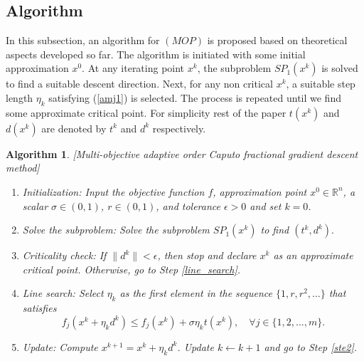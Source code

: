 \documentclass[smallextended,referee,envcountsect]{svjour3}
\newtheorem{Algorithm}{Algorithm}[section]
\begin{document}
\subsection{Algorithm}
In this subsection, an algorithm for $(MOP)$ is proposed based on theoretical aspects developed so far. The algorithm is initiated with some initial approximation $x^0$. At any iterating point $x^k$, the subproblem $SP_1(x^k)$ is solved to find a suitable descent direction. Next, for any non critical $x^k$, a suitable step length $\eta_k$ satisfying (\ref{amj1}) is selected. The process is repeated until we find some approximate critical point. For simplicity rest of the paper $t(x^k)$ and $d(x^k)$ are denoted by $t^k$ and $d^k$ respectively.
\begin{Algorithm}\label{algorithm 1} [Multi-objective adaptive order Caputo fractional gradient descent method]
\begin{enumerate}
    \item {\it Initialization:} Input the objective function $f$, approximation point $x^0 \in \mathbb{R}^n$, a scalar $\sigma \in (0, 1)$, $r \in (0,1)$, and tolerance $\epsilon > 0$ and set  $k = 0$.
    \item {\it Solve the subproblem: }\label{ste2} Solve the subproblem $SP_1(x^k)$ to find $(t^k,d^k).$
    \item {\it Criticality check:} If $\|d^k\| < \epsilon$, then stop and declare $x^k$ as an approximate critical point. Otherwise, go to Step \ref{line_search}.
    \item {\it Line search:} Select $\eta_k$ as the first element in the sequence $\{1, r, r^2, \ldots\}$ that satisfies  $$
        f_j(x^k + \eta_k d^k) \leq f_j(x^k) + \sigma \eta_k t(x^k), \quad \forall j\in\{1,2,...,m\}.
    $$
\label{line_search}
    \item {\it Update:} Compute $x^{k+1} = x^k + \eta_k d^k$. Update $k \gets k + 1$ and go to Step \ref{ste2}.

    
\end{enumerate}
\end{Algorithm}
\end{document}
